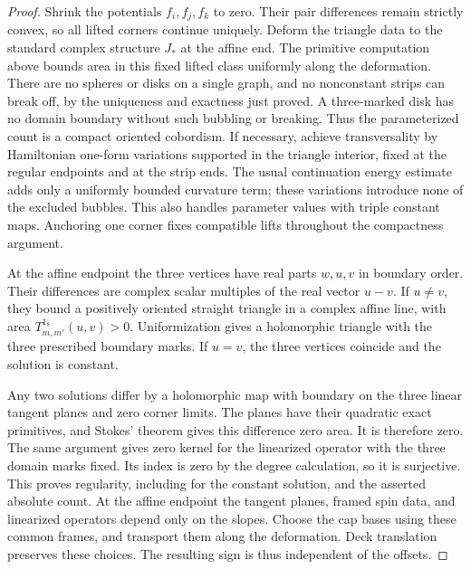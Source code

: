 \documentclass[11pt]{article}
\theoremstyle{definition}
\theoremstyle{remark}
\numberwithin{equation}{section}
\begin{document}
\begin{proof}
Shrink the potentials $f_i,f_j,f_k$ to zero.  Their pair differences remain
strictly convex, so all lifted corners continue uniquely.  Deform the
triangle data to the standard complex structure $J_*$ at the affine end.
The primitive computation above bounds area in this fixed lifted class
uniformly along the deformation.  There are no spheres or disks on a
single graph, and no nonconstant strips can break off, by the uniqueness
and exactness just proved.  A three-marked disk has no domain boundary
without such bubbling or breaking.  Thus the parameterized count is a
compact oriented cobordism.  If necessary, achieve transversality by
Hamiltonian one-form variations supported in the triangle interior,
fixed at the regular endpoints and at the strip ends.  The usual
continuation energy estimate adds only a uniformly bounded curvature
term; these variations introduce none of the excluded bubbles.  This
also handles parameter values with triple constant maps.  Anchoring one
corner fixes compatible lifts throughout the compactness argument.

At the affine endpoint the three vertices have real parts $w,u,v$ in
boundary order.  Their differences are complex scalar multiples of the
real vector $u-v$.  If $u\neq v$, they bound a positively oriented straight
triangle in a complex affine line, with area
$T^{1_8}_{m,m'}(u,v)>0$.  Uniformization gives a holomorphic triangle with
the three prescribed boundary marks.  If $u=v$, the three vertices
coincide and the solution is constant.

Any two solutions differ by a holomorphic map with boundary on the three
linear tangent planes and zero corner limits.  The planes have their
quadratic exact primitives, and Stokes' theorem gives this difference
zero area.  It is therefore zero.  The same argument gives zero kernel
for the linearized operator with the three domain marks fixed.  Its
index is zero by the degree calculation, so it is surjective.  This
proves regularity, including for the constant solution, and the asserted
absolute count.  At the affine endpoint the tangent planes, framed spin
data, and linearized operators depend only on the slopes.  Choose the cap
bases using these common frames, and transport them along the deformation.
Deck translation preserves these choices.  The resulting sign is thus
independent of the offsets.
\end{proof}
\end{document}
